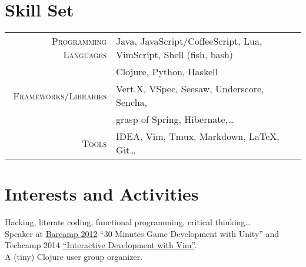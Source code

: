 \documentclass[a4paper,10pt]{article}
\begin{document}
\section{Skill Set}
\begin{tabular}{rl}
    \textsc{Programming Languages} & Java, JavaScript/CoffeeScript, Lua, VimScript, Shell (fish, bash)\\
                                   & Clojure, Python, Haskell\\
    \textsc{Frameworks/Libraries} & Vert.X, VSpec, Seesaw, Underscore, Sencha,\\
                                  & grasp of Spring, Hibernate,\ldots\\
    \textsc{Tools} & IDEA, Vim, Tmux, Markdown, \LaTeX, Git\ldots\\
\end{tabular}

\section{Interests and Activities}
Hacking, literate coding, functional programming, critical thinking\ldots\\
Speaker at \href{http://www.barcampsaigon.org/2012/09/thank-you-barcampers-sponsors-volunteers/}{Barcamp 2012} ``30 Minutes Game Development with Unity'' and Techcamp 2014 \href{http://www.slideshare.net/huylenq/interactive-development-with-vim-techcamp}{``Interactive Development with Vim''}.\\
A (tiny) Clojure user group organizer.\\
\end{document}
